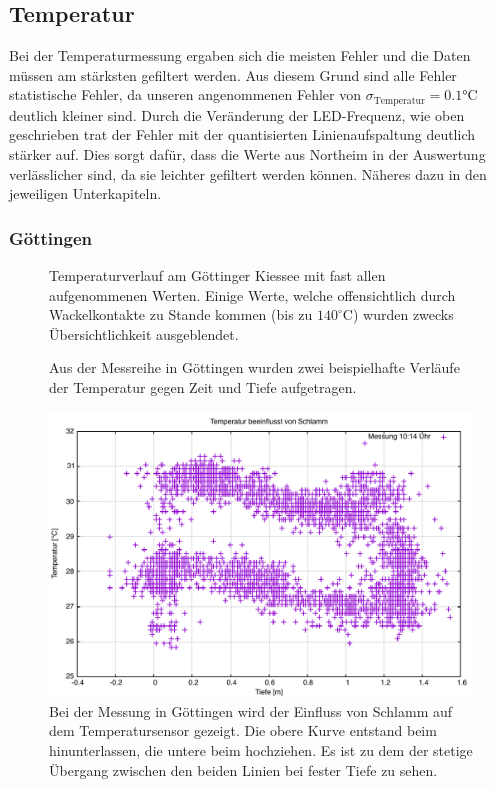 \documentclass[12pt,a4paper,titlepage,headinclude,bibtotoc]{scrartcl}
\numberwithin{equation}{subsection}
\begin{document}
\subsection{Temperatur}
Bei der Temperaturmessung ergaben sich die meisten Fehler und die Daten müssen am stärksten gefiltert werden.
Aus diesem Grund sind alle Fehler statistische Fehler, da unseren angenommenen Fehler von $\sigma_\text{Temperatur}=0.1\si{\celsius}$  deutlich kleiner sind.
Durch die Veränderung der LED-Frequenz, wie oben geschrieben trat der Fehler mit der quantisierten Linienaufspaltung deutlich stärker auf.
Dies sorgt dafür, dass die Werte aus Northeim in der Auswertung verlässlicher sind, da sie leichter gefiltert werden können.
Näheres dazu in den jeweiligen Unterkapiteln.

\subsubsection{Göttingen}
\begin{figure}[h]
\centering

\caption{Temperaturverlauf am Göttinger Kiessee mit fast allen aufgenommenen Werten. Einige Werte, welche offensichtlich durch Wackelkontakte zu Stande kommen (bis zu $140^\circ$C) wurden zwecks Übersichtlichkeit ausgeblendet.}
\label{fig:temp_goe}
\end{figure}
\begin{figure}[!h]
	\centering
   \hfill
	\caption{Aus der Messreihe in Göttingen wurden zwei beispielhafte Verläufe der Temperatur gegen Zeit und Tiefe aufgetragen.}
	\label{fig:tempGoeBsp}
\end{figure}
\begin{figure}[!h]
	\centering
	\includegraphics[width=0.8\linewidth]{TempSchlamm}
	\caption{Bei der Messung in Göttingen wird der Einfluss von Schlamm auf dem Temperatursensor gezeigt. Die obere Kurve entstand beim hinunterlassen, die untere beim hochziehen. Es ist zu dem der stetige Übergang zwischen den beiden Linien bei fester Tiefe zu sehen.}
	\label{fig:tempSchlamm}
\end{figure}
\end{document}
